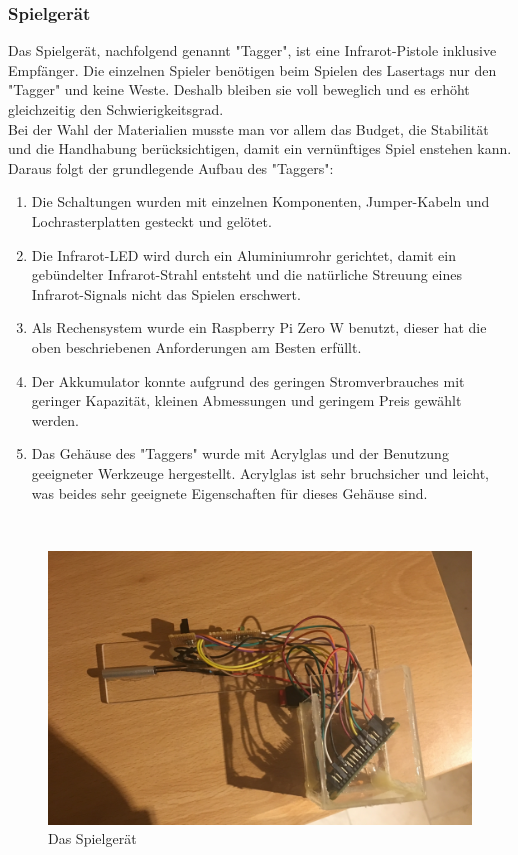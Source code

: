 \subsubsection{Spielgerät}

Das Spielgerät, nachfolgend genannt "Tagger", ist eine Infrarot-Pistole inklusive Empfänger. Die einzelnen Spieler benötigen beim Spielen des Lasertags nur den "Tagger" und keine Weste. Deshalb bleiben sie voll beweglich und es erhöht gleichzeitig den Schwierigkeitsgrad. \\
Bei der Wahl der Materialien musste man vor allem das Budget, die Stabilität und die Handhabung berücksichtigen, damit ein vernünftiges Spiel enstehen kann. Daraus folgt der grundlegende Aufbau des "Taggers":
\begin{enumerate}
	\item Die Schaltungen wurden mit einzelnen Komponenten, Jumper-Kabeln und Lochrasterplatten gesteckt und gelötet.
	\item Die Infrarot-LED wird durch ein Aluminiumrohr gerichtet, damit ein gebündelter Infrarot-Strahl entsteht und die natürliche Streuung eines Infrarot-Signals nicht das Spielen erschwert.
	\item Als Rechensystem wurde ein Raspberry Pi Zero W benutzt, dieser  hat die oben beschriebenen Anforderungen am Besten erfüllt.
	\item Der Akkumulator konnte aufgrund des geringen Stromverbrauches mit geringer Kapazität, kleinen Abmessungen und geringem Preis gewählt werden.
	\item Das Gehäuse des "Taggers" wurde mit Acrylglas und der Benutzung geeigneter Werkzeuge hergestellt. Acrylglas ist sehr bruchsicher und leicht, was beides sehr geeignete Eigenschaften für dieses Gehäuse sind.
\end{enumerate}
\\
\begin{figure}[ht]
	\centering
		\includegraphics[width=0.7 \textwidth]{./040-komponenten/010-hardware/tagger.jpg}
	\caption{Das Spielgerät}
	\label{fig:Bild1Hardware}
\end{figure}

